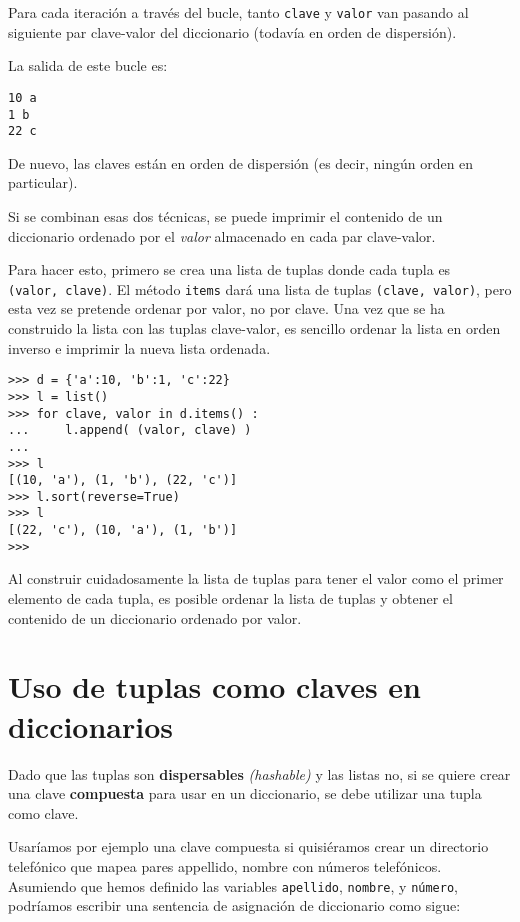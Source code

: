 Para cada iteración a través del bucle, tanto \texttt{clave} y
\texttt{valor} van pasando al siguiente par clave-valor del diccionario
(todavía en orden de dispersión).

La salida de este bucle es:

\begin{Verbatim}[frame=single]
10 a
1 b
22 c
\end{Verbatim}


De nuevo, las claves están en orden de dispersión (es decir, ningún
orden en particular).

Si se combinan esas dos técnicas, se puede imprimir el contenido de un
diccionario ordenado por el \emph{valor} almacenado en cada par
clave-valor.

Para hacer esto, primero se crea una lista de tuplas donde cada tupla es
\texttt{(valor,\ clave)}. El método \texttt{items} dará una lista de
tuplas \texttt{(clave,\ valor)}, pero esta vez se pretende ordenar por
valor, no por clave. Una vez que se ha construido la lista con las
tuplas clave-valor, es sencillo ordenar la lista en orden inverso e
imprimir la nueva lista ordenada.


\begin{Verbatim}[frame=single]
>>> d = {'a':10, 'b':1, 'c':22}
>>> l = list()
>>> for clave, valor in d.items() :
...     l.append( (valor, clave) )
...
>>> l
[(10, 'a'), (1, 'b'), (22, 'c')]
>>> l.sort(reverse=True)
>>> l
[(22, 'c'), (10, 'a'), (1, 'b')]
>>>
\end{Verbatim}

Al construir cuidadosamente la lista de tuplas para tener el valor como
el primer elemento de cada tupla, es posible ordenar la lista de tuplas
y obtener el contenido de un diccionario ordenado por valor.


\hypertarget{uso-de-tuplas-como-claves-en-diccionarios}{%
\section{Uso de tuplas como claves en
diccionarios}\label{uso-de-tuplas-como-claves-en-diccionarios}}

 

Dado que las tuplas son \textbf{dispersables} \emph{(hashable)} y las
listas no, si se quiere crear una clave \textbf{compuesta} para usar en
un diccionario, se debe utilizar una tupla como clave.

Usaríamos por ejemplo una clave compuesta si quisiéramos crear un
directorio telefónico que mapea pares appellido, nombre con números
telefónicos. Asumiendo que hemos definido las variables
\texttt{apellido}, \texttt{nombre}, y \texttt{número}, podríamos
escribir una sentencia de asignación de diccionario como sigue:


